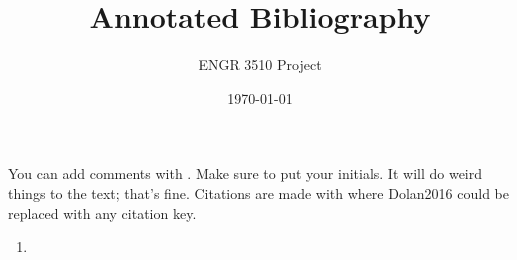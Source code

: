 \documentclass[12pt,letterpaper]{article}
\begin{document}
\title{Annotated Bibliography}
\author{ENGR 3510 Project}
\date{\today}
\maketitle

You can add comments with . Make sure to put your initials. It will do weird things to the text; that's fine. 
Citations are made with \cite{Dolan2016} where Dolan2016 could be replaced with any citation key. 



\begin{enumerate}
	\item \cite{Nan2013}
\end{enumerate}

\printbibliography
\end{document}
